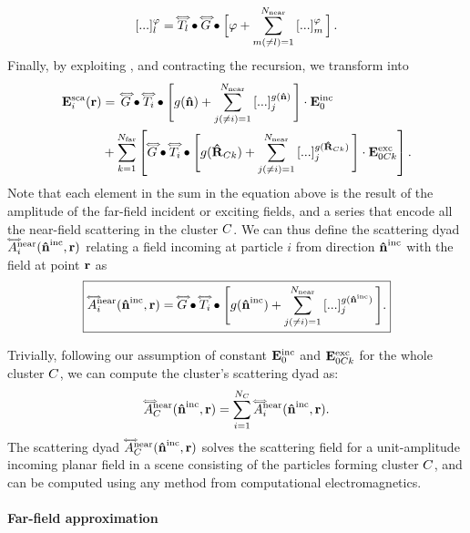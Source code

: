 \begin{equation}
\label{eq:recursivity2}
[...]_l^\varphi= \dyad{T}_l\bigcdot{\px'}\sGreen\bigcdot{\px''} \Big[\varphi + \sum_{m(\neq l)=1}^\Nnear \left[...\right]_m^\varphi\Big] \,.
\end{equation}
%
Finally, by exploiting , and contracting the recursion, we transform  into
%
\begin{align}
\label{eq:scafieldcluster5}
\ScaEField_i(\px) &= \, \sGreen \bigcdot{\px'} \dyad{T}_i \bigcdot{\px''} \Bigg[ \sGreenProp(\dw) + \sum_{j(\neq i)=1}^\Nnear \left[...\right]_j^{\sGreenProp(\dw)} \Bigg] \cdot \IncEField_0\\
& + \sum_{k=1}^\Nfar \left[ \sGreen \bigcdot{\px'} \dyad{T}_i \bigcdot{\px''} \Bigg[ \sGreenProp(\dPx_{\Cls k}) + \sum_{j(\neq i)=1}^\Nnear \left[...\right]_j^{\sGreenProp(\dPx_{\Cls k})} \Bigg]\cdot\ExcEField_{0\Cls k}\right]. \nonumber 
\end{align}
%
Note that each element in the sum in the equation above is the result of the amplitude of the far-field incident or exciting fields, and a series that encode all the near-field scattering in the cluster $C$. We can thus define the scattering dyad $\accentset{\Longleftrightarrow}{A}_i^\text{near}(\mathbf{\hat{n}}^{\text{inc}},\mathbf{r})$ relating a field incoming at particle $i$ from direction $\mathbf{\hat{n}}^{\text{inc}}$ with the field at point $\mathbf{r}$ as
\begin{equation}
\boxed{\ScaDyad_i^\text{near}(\dwi,\px) = \sGreen \bigcdot{\px'} \dyad{T}_i\bigcdot{\px''} \Bigg[ \sGreenProp(\dwi) + \sum_{j(\neq i)=1}^\Nnear \left[...\right]_j^{\sGreenProp(\dwi)} \Bigg].}
\label{eq:scatdyad_near}
\end{equation}
%
%

Trivially, following our assumption of constant $\mathbf{E}^\text{inc}_0$ and $\mathbf{E}^\text{exc}_{0C k}$ for the whole cluster $C$, we can compute the cluster's scattering dyad as:
\begin{equation}
\ScaDyad_\Cls^\text{near}(\dwi,\px) = \sum_{i=1}^{N_\Cls} \ScaDyad_i^\text{near}(\dwi,\px).
\label{eq:scatdyadcluster_near}
\end{equation}
The scattering dyad $\accentset{\Longleftrightarrow}{A}_C^\text{near}(\mathbf{\hat{n}}^{\text{inc}},\mathbf{r})$ solves the scattering field for a unit-amplitude incoming planar field in a scene consisting of the particles forming cluster $C$, and can be computed using any method from computational electromagnetics. 


\paragraph{Far-field approximation}

